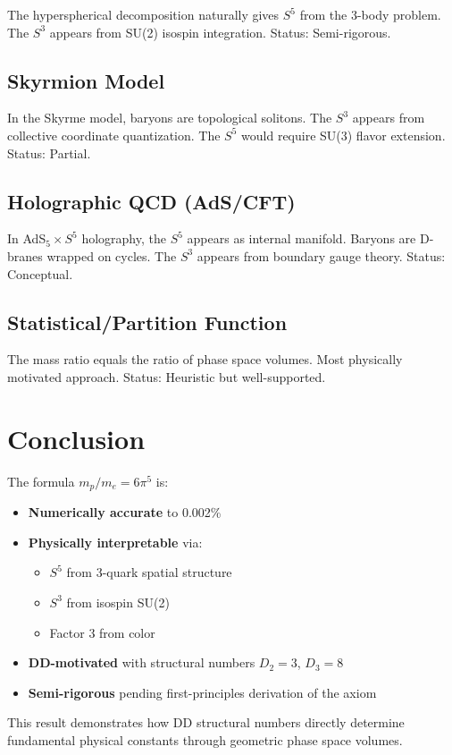 The hyperspherical decomposition naturally gives $S^5$ from the 3-body problem. The $S^3$ appears from SU(2) isospin integration. Status: Semi-rigorous.

\subsection{Skyrmion Model}

In the Skyrme model, baryons are topological solitons. The $S^3$ appears from collective coordinate quantization. The $S^5$ would require SU(3) flavor extension. Status: Partial.

\subsection{Holographic QCD (AdS/CFT)}

In AdS$_5 \times S^5$ holography, the $S^5$ appears as internal manifold. Baryons are D-branes wrapped on cycles. The $S^3$ appears from boundary gauge theory. Status: Conceptual.

\subsection{Statistical/Partition Function}

The mass ratio equals the ratio of phase space volumes. Most physically motivated approach. Status: Heuristic but well-supported.

\section{Conclusion}

The formula $m_p/m_e = 6\pi^5$ is:

\begin{itemize}
\item \textbf{Numerically accurate} to 0.002\%
\item \textbf{Physically interpretable} via:
  \begin{itemize}
  \item $S^5$ from 3-quark spatial structure
  \item $S^3$ from isospin SU(2)
  \item Factor 3 from color
  \end{itemize}
\item \textbf{DD-motivated} with structural numbers $D_2 = 3$, $D_3 = 8$
\item \textbf{Semi-rigorous} pending first-principles derivation of the axiom
\end{itemize}

This result demonstrates how DD structural numbers directly determine fundamental physical constants through geometric phase space volumes.
